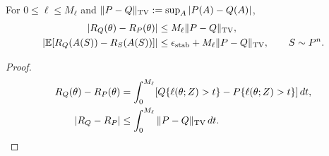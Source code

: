 \begin{proposition}
For $0\le\ell\le M_\ell$ and $\|P-Q\|_{\rm TV}:=\sup_A|P(A)-Q(A)|$,
\begin{align}
 |R_Q(\theta)-R_P(\theta)|&\le M_\ell\|P-Q\|_{\rm TV},\\
 |\mathbb E[R_Q(A(S))-R_S(A(S))]|
 &\le\epsilon_{\rm stab}+M_\ell\|P-Q\|_{\rm TV},\qquad S\sim P^n.
\end{align}
\end{proposition}
\begin{proof}
\begin{align}
 R_Q(\theta)-R_P(\theta)
 &=\int_0^{M_\ell}[Q\{\ell(\theta;Z)>t\}-P\{\ell(\theta;Z)>t\}]\,dt,\\
 |R_Q-R_P|&\le\int_0^{M_\ell}\|P-Q\|_{\rm TV}\,dt.
\end{align}
\end{proof}
